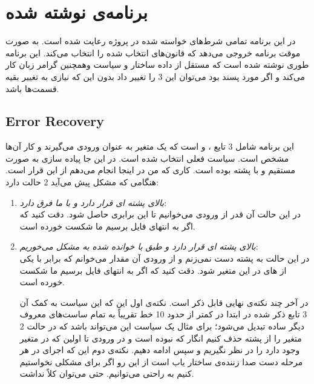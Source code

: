 \documentclass [a4paper]{article}
\begin{document}
	\section{برنامه‌ی نوشته شده}
	در این برنامه تمامی شرط‌های خواسته شده در پروژه رعایت شده است. به صورت
	موقت برنامه خروجی می‌دهد که قانون‌های انتخاب شده را انتخاب می‌کند. این برنامه طوری نوشته شده است که مستقل از داده ساختار 
	و سیاست
	وهمچنین گرامر زبان
	کار می‌کند و اگر مورد پسند بود می‌توان این 3 را تغییر داد بدون این که نیازی
	به تغییر بقیه قسمت‌ها باشد.
	\subsection{Error Recovery}
	این برنامه شامل 3 تایع
	،
	و
	است که یک متغیر به عنوان ورودی می‌گیرند و کار آن‌ها مشخص است. سیاست فعلی انتخاب شده 
	است. در این جا پیاده سازی به صورت مستقیم و با پشته بوده است. کاری که من در اینجا انجام می‌دهم از این قرار است. هنگامی که مشکل پیش می‌آید 2 حالت دارد:
	\begin{enumerate}
		\item
		{ \it
		بالای پشته
		ای 
		قرار دارد و با 
		ما فرق دارد}:\\
		
		در این حالت آن قدر از ورودی می‌خوانیم تا این برابری حاصل شود. دقت
		کنید که اگر به انتهای فایل برسیم 
		ما شکست خورده است.
		\item
		{ \it
			بالای پشته
			ای 
			قرار دارد و طبق 
			با 
			خوانده شده به مشکل می‌خوریم}:\\
		
		در این حالت به پشته دست نمی‌زنم و از ورودی آن مقدار می‌خوانم که
		برابر با یکی از 
		های
		در 
		این متغیر شود. دقت
		کنید که اگر به انتهای فایل برسیم 
		ما شکست خورده است.
		
		در آخر چند نکته‌ی نهایی قابل ذکر است.  نکته‌ی اول این که این سیاست به کمک آن 3 تابع ذکر شده در ابتدا در کمتر از حدود 10 خط تقریباً به تمام ساست‌های معروف دیگر ساده تبدیل می‌شود؛ برای مثال یک سیاست این می‌تواند باشد که در حالت 2 متغیر را از پشته حذف کنیم انگار که نبوده است و در ورودی تا اولین
		که در
		متغیر وجود دارد را در نظر نگیریم و سپس ادامه دهیم.
		نکته‌ی دوم این که اجرای 
		در هر مرحله دست صدا زننده‌ی ساختار یاب است از این رو اگر برای مشکلی
		نخواستیم 
		کنیم به راحتی می‌توانیم. حتی می‌توان کلاً 
		نداشت.
	\end{enumerate}
\end{document}
